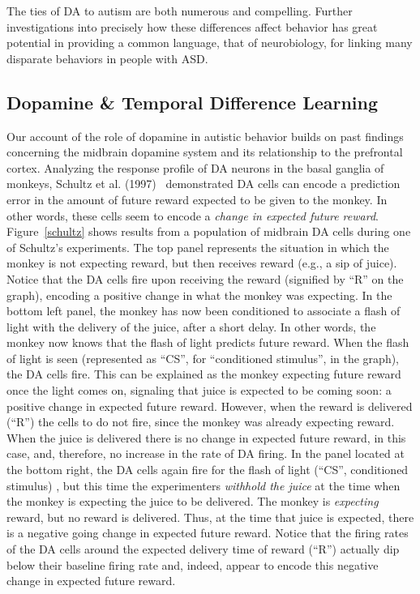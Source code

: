 The ties of DA to autism are both numerous and compelling.  Further investigations into precisely how these differences affect behavior has great potential in providing a common language, that of neurobiology, for linking many disparate behaviors in people with ASD.

\subsection{Dopamine \& Temporal Difference Learning}
Our account of the role of dopamine in autistic behavior builds on past findings concerning the midbrain dopamine system and its relationship to the prefrontal cortex. Analyzing the response profile of DA neurons in the basal ganglia of monkeys, Schultz et al. (1997)~\nocite{schultz97td} demonstrated DA cells can encode a prediction error in the amount of future reward expected to be given to the monkey.  In other words, these cells seem to encode a \emph{change in expected future reward}.  Figure~\ref{schultz} shows results from a population of midbrain DA cells during one of Schultz's experiments.  The top panel represents the situation in which the monkey is not expecting reward, but then receives reward (e.g., a sip of juice).  Notice that the DA cells fire upon receiving the reward (signified by ``R'' on the graph), encoding a positive change in what the monkey was expecting.  In the bottom left panel, the monkey has now been conditioned to associate a flash of light with the delivery of the juice, after a short delay.  In other words, the monkey now knows that the flash of light predicts future reward.  When the flash of light is seen (represented as ``CS'', for ``conditioned stimulus'', in the graph), the DA cells fire.  This can be explained as the monkey expecting future reward once the light comes on, signaling that juice is expected to be coming soon: a positive change in expected future reward.  However, when the reward is delivered (``R'') the cells to do not fire, since the monkey was already expecting reward.  When the juice is delivered there is no change in expected future reward, in this case, and, therefore, no increase in the rate of DA firing.  In the panel located at the bottom right, the DA cells again fire for the flash of light (``CS'', conditioned stimulus) , but this time the experimenters \emph{withhold the juice} at the time when the monkey is expecting the juice to be delivered.  The monkey is \emph{expecting} reward, but no reward is delivered. Thus, at the time that juice is expected, there is a negative going change in expected future reward.  Notice that the firing rates of the DA cells around the expected delivery time of reward (``R'') actually dip below their baseline firing rate and, indeed, appear to encode this negative change in expected future reward.

